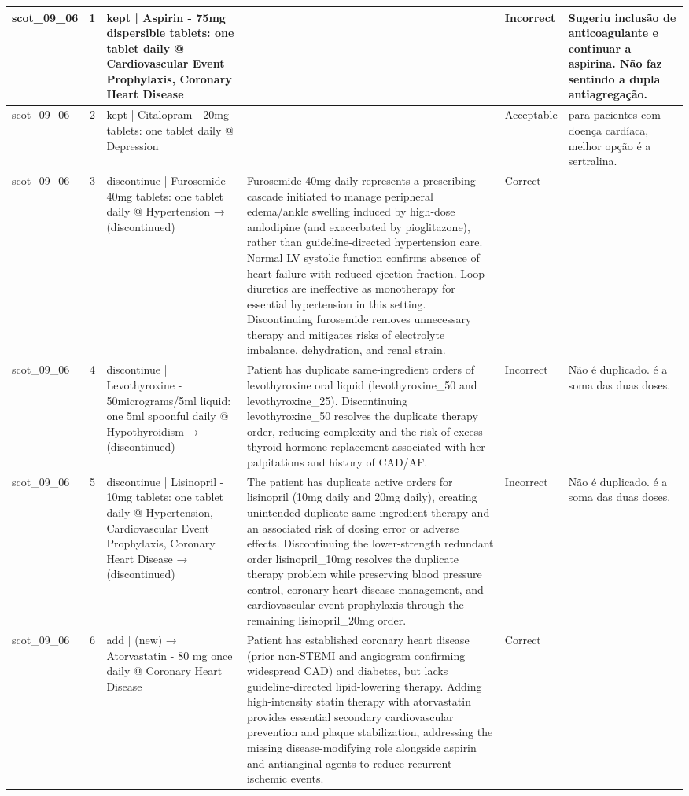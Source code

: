 \begin{longtable}{|p{1.45cm}|c|p{3.3cm}|p{6.5cm}|p{1.55cm}|p{2.3cm}|}
\hline
scot\_09\_06 & 1 & kept | Aspirin - 75mg dispersible tablets: one tablet daily @ Cardiovascular Event Prophylaxis, Coronary Heart Disease &  & Incorrect & Sugeriu inclusão de anticoagulante e continuar a aspirina. Não faz sentindo a dupla antiagregação. \\
\hline
scot\_09\_06 & 2 & kept | Citalopram - 20mg tablets: one tablet daily @ Depression &  & Acceptable & para pacientes com doença cardíaca, melhor opção é a sertralina. \\
\hline
scot\_09\_06 & 3 & discontinue | Furosemide - 40mg tablets: one tablet daily @ Hypertension → (discontinued) & Furosemide 40mg daily represents a prescribing cascade initiated to manage peripheral edema/ankle swelling induced by high-dose amlodipine (and exacerbated by pioglitazone), rather than guideline-directed hypertension care. Normal LV systolic function confirms absence of heart failure with reduced ejection fraction. Loop diuretics are ineffective as monotherapy for essential hypertension in this setting. Discontinuing furosemide removes unnecessary therapy and mitigates risks of electrolyte imbalance, dehydration, and renal strain. & Correct &  \\
\hline
scot\_09\_06 & 4 & discontinue | Levothyroxine - 50micrograms/5ml liquid: one 5ml spoonful daily @ Hypothyroidism → (discontinued) & Patient has duplicate same-ingredient orders of levothyroxine oral liquid (levothyroxine\_50 and levothyroxine\_25). Discontinuing levothyroxine\_50 resolves the duplicate therapy order, reducing complexity and the risk of excess thyroid hormone replacement associated with her palpitations and history of CAD/AF. & Incorrect & Não é duplicado. é a soma das duas doses. \\
\hline
scot\_09\_06 & 5 & discontinue | Lisinopril - 10mg tablets: one tablet daily @ Hypertension, Cardiovascular Event Prophylaxis, Coronary Heart Disease → (discontinued) & The patient has duplicate active orders for lisinopril (10mg daily and 20mg daily), creating unintended duplicate same-ingredient therapy and an associated risk of dosing error or adverse effects. Discontinuing the lower-strength redundant order lisinopril\_10mg resolves the duplicate therapy problem while preserving blood pressure control, coronary heart disease management, and cardiovascular event prophylaxis through the remaining lisinopril\_20mg order. & Incorrect & Não é duplicado. é a soma das duas doses. \\
\hline
scot\_09\_06 & 6 & add | (new) → Atorvastatin - 80 mg once daily @ Coronary Heart Disease & Patient has established coronary heart disease (prior non-STEMI and angiogram confirming widespread CAD) and diabetes, but lacks guideline-directed lipid-lowering therapy. Adding high-intensity statin therapy with atorvastatin provides essential secondary cardiovascular prevention and plaque stabilization, addressing the missing disease-modifying role alongside aspirin and antianginal agents to reduce recurrent ischemic events. & Correct &  \\

\end{longtable}
